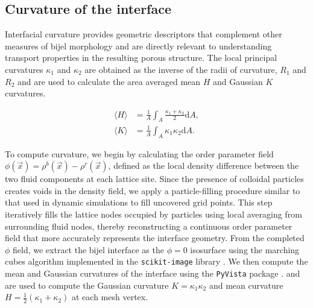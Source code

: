 \subsection{Curvature of the interface}

Interfacial curvature provides geometric descriptors that complement other measures of bijel morphology and are directly relevant to understanding transport properties in the resulting porous structure.
\cite{reeves_quantitative_2016} The local principal curvatures \(\kappa_1\) and \(\kappa_2\) are obtained as the inverse of the radii of curvature, \(R_1\) and \(R_2\) and are used to calculate
the area averaged mean $H$ and Gaussian $K$ curvatures.

\begin{align}
\langle H \rangle &= \frac{1}{A}\int_A \frac{\kappa_1+\kappa_2}{2} \mathrm{d}A , \\
\langle K \rangle &= \frac{1}{A}\int_A \kappa_1\kappa_2 \mathrm{d}A .
\end{align} 

To compute curvature, we begin by calculating 
the order parameter field \(\phi(\vec{x}) = \rho^{b}(\vec{x}) - \rho^{r}(\vec{x})\), defined as the local density difference between the two fluid components at each lattice site. Since the presence 
of colloidal particles creates voids in the density field, we apply a particle-filling procedure similar to that used in dynamic simulations to fill uncovered grid points. This step iteratively fills 
the lattice nodes occupied by particles using local averaging from surrounding fluid nodes, thereby reconstructing a continuous order parameter field that more accurately represents the interface geometry.
From the completed \(\phi\) field, we extract the bijel interface as the \(\phi = 0\) isosurface using the marching cubes algorithm implemented in the \texttt{scikit-image} library \cite{van2014scikit}. 
We then compute the mean and Gaussian curvatures of the interface using the \texttt{PyVista} package \cite{sullivan2019pyvista}. and are used to compute the Gaussian curvature \(K = \kappa_1 \kappa_2\) and mean curvature \(H = \frac{1}{2}(\kappa_1 + \kappa_2)\) at each mesh vertex.


